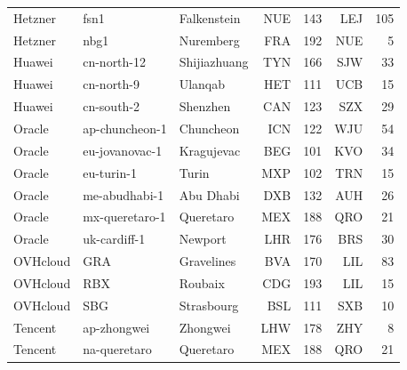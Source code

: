 \begin{tabular}{lllrrrr}
Hetzner & fsn1 & Falkenstein & NUE & 143 & LEJ & 105 \\
Hetzner & nbg1 & Nuremberg & FRA & 192 & NUE & 5 \\
Huawei & cn-north-12 & Shijiazhuang & TYN & 166 & SJW & 33 \\
Huawei & cn-north-9 & Ulanqab & HET & 111 & UCB & 15 \\
Huawei & cn-south-2 & Shenzhen & CAN & 123 & SZX & 29 \\
Oracle & ap-chuncheon-1 & Chuncheon & ICN & 122 & WJU & 54 \\
Oracle & eu-jovanovac-1 & Kragujevac & BEG & 101 & KVO & 34 \\
Oracle & eu-turin-1 & Turin & MXP & 102 & TRN & 15 \\
Oracle & me-abudhabi-1 & Abu Dhabi & DXB & 132 & AUH & 26 \\
Oracle & mx-queretaro-1 & Queretaro & MEX & 188 & QRO & 21 \\
Oracle & uk-cardiff-1 & Newport & LHR & 176 & BRS & 30 \\
OVHcloud & GRA & Gravelines & BVA & 170 & LIL & 83 \\
OVHcloud & RBX & Roubaix & CDG & 193 & LIL & 15 \\
OVHcloud & SBG & Strasbourg & BSL & 111 & SXB & 10 \\
Tencent & ap-zhongwei & Zhongwei & LHW & 178 & ZHY & 8 \\
Tencent & na-queretaro & Queretaro & MEX & 188 & QRO & 21 \\
\bottomrule
\end{tabular}
